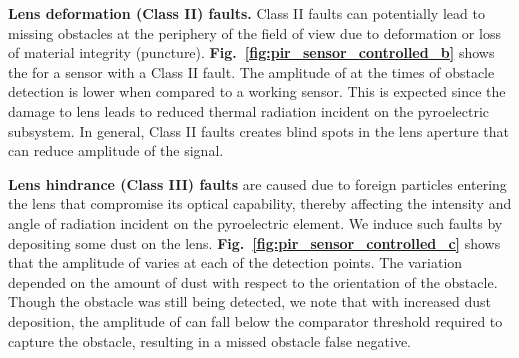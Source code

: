 \textbf{Lens deformation (Class II) faults.} Class II faults can potentially lead to missing obstacles at the periphery of the field of view due to deformation or loss of material integrity (\eg puncture). 
\textbf{Fig.~\ref{fig:pir_sensor_controlled_b}} shows the \aout for a sensor with a Class II fault. The amplitude of \aout at the times of obstacle detection is lower when compared to a working sensor. This is expected since the damage to lens leads to reduced thermal radiation incident on the pyroelectric subsystem. In general, Class II faults creates blind spots in the lens aperture that can reduce amplitude of the \aout signal. 


\textbf{Lens hindrance (Class III) faults} are caused due to foreign particles entering the lens that compromise its optical capability, thereby affecting the intensity and angle of radiation incident on the pyroelectric element. 
%
We induce such faults by depositing some dust on the lens.
\textbf{Fig.~\ref{fig:pir_sensor_controlled_c}} shows that the amplitude of \aout varies at each of the detection points. The variation depended on the amount of dust with respect to the orientation of the obstacle. Though the obstacle was still being detected, we note that with increased dust deposition, the amplitude of \aout can fall below the comparator threshold required to capture the obstacle, resulting in a missed obstacle \ie false negative. 

